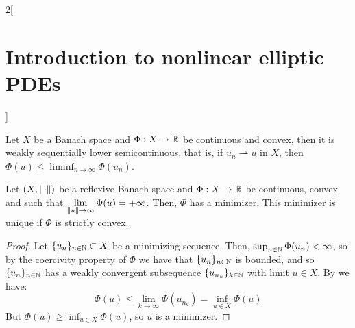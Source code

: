 \documentclass[../../../main_math.tex]{subfiles}
\begin{document}
\begin{multicols}{2}[\section{Introduction to nonlinear elliptic PDEs}]
  \begin{lemma}\label{INEPDE:optimization}
    Let $X$ be a Banach space and $\Phi:X\to \mathbb{R}$ be continuous and convex, then it is weakly sequentially lower semicontinuous, that is, if $u_n\rightharpoonup u$ in $X$, then $\Phi(u)\leq \liminf_{n\to\infty}\Phi(u_n)$.
  \end{lemma}
  \begin{theorem}
    Let $(X,\left\|\cdot\right\|)$ be a reflexive Banach space and $\Phi:X\to \mathbb{R}$ be continuous, convex and such that $\displaystyle \lim_{\left\|u\right\|\to\infty}\Phi(u)=+\infty$. Then, $\Phi$ has a minimizer. This minimizer is unique if $\Phi$ is strictly convex.
  \end{theorem}
  \begin{proof}
    Let $\{u_n\}_{n\in\mathbb{N}}\subset X$ be a minimizing sequence. Then, $\sup_{n\in\mathbb{N}}\Phi(u_n)<\infty$, so by the coercivity property of $\Phi$ we have that $\{u_n\}_{n\in\mathbb{N}}$ is bounded, and so $\{u_n\}_{n\in\mathbb{N}}$ has a weakly convergent subsequence $\{u_{n_k}\}_{k\in\mathbb{N}}$ with limit $u\in X$. By  we have:
    $$
      \Phi(u)\leq \lim_{k\to\infty}\Phi(u_{n_k})=\inf_{u\in X}\Phi(u)
    $$
    But $\Phi(u)\geq \inf_{u\in X}\Phi(u)$, so $u$ is a minimizer.
  \end{proof}
\end{multicols}
\end{document}
